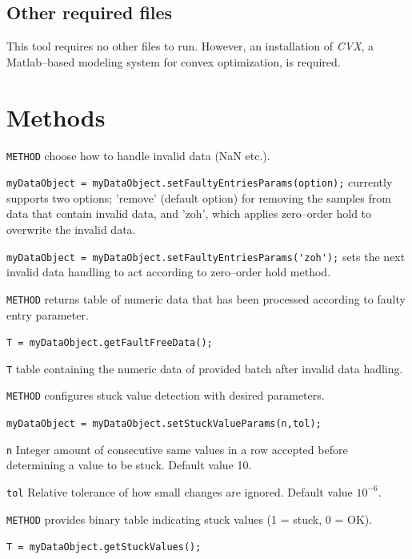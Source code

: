 \documentclass[twoside,a4paper]{refart}
\begin{document}
\subsection{Other required files}
This tool requires no other files to run. However, an installation of \emph{CVX}, a Matlab--based modeling system for convex optimization, is required.


\section{Methods}
\verb|METHOD| choose how to handle invalid data (NaN etc.).

\verb|myDataObject = myDataObject.setFaultyEntriesParams(option);| currently supports two options; 'remove' (default option) for removing the samples from data that contain invalid data, and 'zoh', which applies zero--order hold to overwrite the invalid data.

\verb|myDataObject = myDataObject.setFaultyEntriesParams('zoh');| sets the next invalid data handling to act according to zero--order hold method.

\verb|METHOD| returns table of numeric data that has been processed according to faulty entry parameter.

\verb|T = myDataObject.getFaultFreeData();|

\verb|T| table containing the numeric data of provided batch after invalid data hadling.

\verb|METHOD| configures stuck value detection with desired parameters.

\verb|myDataObject = myDataObject.setStuckValueParams(n,tol);|

\verb|n| Integer amount of consecutive same values in a row accepted before determining a value to be stuck. Default value 10.

\verb|tol| Relative tolerance of how small changes are ignored. Default value $10^{-6}$.

\verb|METHOD| provides binary table indicating stuck values (1 = stuck, 0 = OK).

\verb|T = myDataObject.getStuckValues();|
\end{document}
